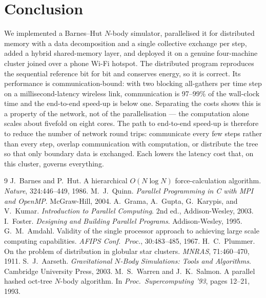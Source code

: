 \documentclass[11pt,a4paper]{article}
\begin{document}
\section{Conclusion}
\label{sec:conclusion}

We implemented a Barnes--Hut $N$-body simulator, parallelised it for distributed
memory with a data decomposition and a single collective exchange per step, added a
hybrid shared-memory layer, and deployed it on a genuine four-machine cluster joined
over a phone Wi-Fi hotspot. The distributed program reproduces the sequential
reference bit for bit and conserves energy, so it is correct. Its performance is
communication-bound: with two blocking all-gathers per time step on a
millisecond-latency wireless link, communication is 97--99\% of the wall-clock time
and the end-to-end speed-up is below one. Separating the costs shows this is a
property of the network, not of the parallelisation --- the computation alone scales
about fivefold on eight cores. The path to end-to-end speed-up is therefore to
reduce the number of network round trips: communicate every few steps rather than
every step, overlap communication with computation, or distribute the tree so that
only boundary data is exchanged. Each lowers the latency cost that, on this cluster,
governs everything.

\begin{thebibliography}{9}
 J.\ Barnes and P.\ Hut. A hierarchical $O(N\log N)$
force-calculation algorithm. \emph{Nature}, 324:446--449, 1986.
 M.\ J.\ Quinn. \emph{Parallel Programming in C with MPI and
OpenMP}. McGraw-Hill, 2004.
 A.\ Grama, A.\ Gupta, G.\ Karypis, and V.\ Kumar.
\emph{Introduction to Parallel Computing}. 2nd ed., Addison-Wesley, 2003.
 I.\ Foster. \emph{Designing and Building Parallel Programs}.
Addison-Wesley, 1995.
 G.\ M.\ Amdahl. Validity of the single processor approach to
achieving large scale computing capabilities. \emph{AFIPS Conf.\ Proc.},
30:483--485, 1967.
 H.\ C.\ Plummer. On the problem of distribution in globular
star clusters. \emph{MNRAS}, 71:460--470, 1911.
 S.\ J.\ Aarseth. \emph{Gravitational $N$-Body Simulations:
Tools and Algorithms}. Cambridge University Press, 2003.
 M.\ S.\ Warren and J.\ K.\ Salmon. A parallel hashed oct-tree
$N$-body algorithm. In \emph{Proc.\ Supercomputing '93}, pages 12--21, 1993.
\end{thebibliography}
\end{document}
